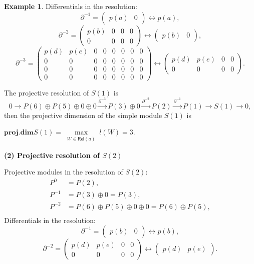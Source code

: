 \documentclass[11pt]{amsart}
\numberwithin{equation}{section}
\theoremstyle{definition}
\newtheorem{example}[theorem]{Example}
\begin{document}
\begin{example}
	
	Differentials in the resolution:
	\[
	\partial^{-1} = \begin{pmatrix} p(a) & 0 \end{pmatrix} \longleftrightarrow p(a),
	\]
	\[
	\partial^{-2} = \begin{pmatrix} p(b) & 0 & 0 & 0 \\ 0 & 0 & 0 & 0 \end{pmatrix} \longleftrightarrow \begin{pmatrix} p(b) & 0 \end{pmatrix},
	\]
	\[
	\partial^{-3} = \begin{pmatrix} p(d) & p(e) & 0 & 0 & 0 & 0 & 0 & 0 \\ 0 & 0 & 0 & 0 & 0 & 0 & 0 & 0 \\ 0 & 0 & 0 & 0 & 0 & 0 & 0 & 0 \\ 0 & 0 & 0 & 0 & 0 & 0 & 0 & 0 \end{pmatrix} \longleftrightarrow \begin{pmatrix} p(d) & p(e) & 0 & 0 \\ 0 & 0 & 0 & 0 \end{pmatrix}.
	\]
	
	The projective resolution of \( S(1) \) is
	\[
	0 \to P(6) \oplus P(5) \oplus 0 \oplus 0 \xrightarrow{\partial^{-3}} P(3) \oplus 0 \xrightarrow{\partial^{-2}} P(2) \xrightarrow{\partial^{-1}} P(1) \to S(1)  \to 0,
	\]
	then the projective dimension of the simple module \( S(1) \) is 
	\begin{center}
		\( \textbf{proj.dim} S(1) = \max\limits_{\substack{W \in \mathsf{Rel}(a)}} l(W) = 3 \).
	\end{center}
	\textbf{(2)  Projective resolution of \( S(2) \)}
	
	Projective modules in the resolution of \( S(2) \):
	\[
	\begin{aligned}
		P^0    &=  P(2), \\
		P^{-1} &=  P(3) \oplus 0 = P(3), \\
		P^{-2} &=  P(6) \oplus P(5) \oplus 0 \oplus 0 = P(6) \oplus P(5), \\ 
	\end{aligned}
	\]
	Differentials in the resolution:
	\[
	\partial^{-1} = \begin{pmatrix} p(b) & 0 \end{pmatrix} \longleftrightarrow p(b),
	\]
	\[
	\partial^{-2} = \begin{pmatrix} p(d) & p(e) & 0 & 0 \\ 0 & 0 & 0 & 0 \end{pmatrix} \longleftrightarrow \begin{pmatrix} p(d) & p(e) \end{pmatrix}.
	\]
	

\end{example}
\end{document}
